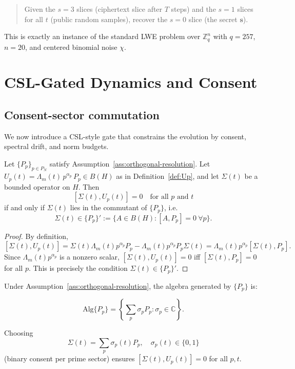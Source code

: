 \documentclass[11pt]{article}
\begin{document}
\begin{quote}
Given the $s=3$ slices (ciphertext slice after $T$ steps) and the $s=1$ slices
for all $t$ (public random samples), recover the $s=0$ slice (the secret
$\mathbf{s}$).
\end{quote}

This is exactly an instance of the standard LWE problem over $\mathbb{Z}_q^n$
with $q=257$, $n=20$, and centered binomial noise $\chi$.\cite{pqc-lwe}

\section{CSL-Gated Dynamics and Consent}

\subsection{Consent-sector commutation}

We now introduce a CSL-style gate that constrains the evolution by consent,
spectral drift, and norm budgets.

\begin{lemma}\label{lem:commutator}
Let $\{P_p\}_{p\in P_N}$ satisfy Assumption~\ref{ass:orthogonal-resolution}.
Let $U_p(t) = \Lambda_m(t)\, p^{\alpha_p}\, P_p \in B(H)$ as in Definition~\ref{def:Up},
and let $\Sigma(t)$ be a bounded operator on $H$. Then
\[
[\Sigma(t), U_p(t)] = 0 \quad \text{for all $p$ and $t$}
\]
if and only if $\Sigma(t)$ lies in the commutant of $\{P_p\}$, i.e.
\[
\Sigma(t) \in \{P_p\}' := \{A \in B(H): [A, P_p] = 0\ \forall p\}.
\]
\end{lemma}

\begin{proof}
By definition,
\[
[\Sigma(t), U_p(t)] = \Sigma(t)\Lambda_m(t) p^{\alpha_p} P_p - \Lambda_m(t) p^{\alpha_p} P_p \Sigma(t)
= \Lambda_m(t) p^{\alpha_p} [\Sigma(t), P_p].
\]
Since $\Lambda_m(t) p^{\alpha_p}$ is a nonzero scalar, $[\Sigma(t), U_p(t)] = 0$
iff $[\Sigma(t), P_p]=0$ for all $p$. This is precisely the condition
$\Sigma(t) \in \{P_p\}'$.
\end{proof}

Under Assumption~\ref{ass:orthogonal-resolution}, the algebra generated by
$\{P_p\}$ is:

\[
\mathrm{Alg}\{P_p\} = \left\{\sum_p \sigma_p P_p : \sigma_p \in \mathbb{C}\right\}.
\]

Choosing
\[
\Sigma(t) = \sum_p \sigma_p(t) P_p,\quad \sigma_p(t)\in\{0,1\}
\]
(binary consent per prime sector) ensures $[\Sigma(t), U_p(t)]=0$ for all $p,t$.
\end{document}
